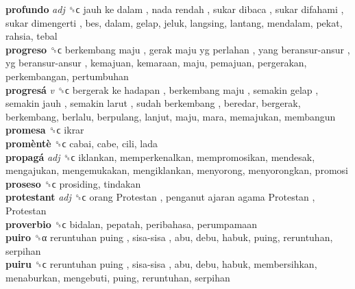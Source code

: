\textbf{profundo} \emph{adj}  ␝ϲ   jauh ke dalam ,  nada rendah ,  sukar dibaca ,  sukar difahami ,  sukar dimengerti , bes, dalam, gelap, jeluk, langsing, lantang, mendalam, pekat, rahsia, tebal  \\
\textbf{progreso} ␝ϲ   berkembang maju ,  gerak maju yg perlahan ,  yang beransur-ansur ,  yg beransur-ansur , kemajuan, kemaraan, maju, pemajuan, pergerakan, perkembangan, pertumbuhan  \\
\textbf{progresá} \emph{v}  ␝ϲ   bergerak ke hadapan ,  berkembang maju ,  semakin gelap ,  semakin jauh ,  semakin larut ,  sudah berkembang , beredar, bergerak, berkembang, berlalu, berpulang, lanjut, maju, mara, memajukan, membangun  \\
\textbf{promesa} ␝ϲ  ikrar  \\
\textbf{promèntè} ␝ϲ  cabai, cabe, cili, lada  \\
\textbf{propagá} \emph{adj}  ␝ϲ  iklankan, memperkenalkan, mempromosikan, mendesak, mengajukan, mengemukakan, mengiklankan, menyorong, menyorongkan, promosi  \\
\textbf{proseso} ␝ϲ  prosiding, tindakan  \\
\textbf{protestant} \emph{adj}  ␝ϲ   orang Protestan ,  penganut ajaran agama Protestan ,  Protestan   \\
\textbf{proverbio} ␝ϲ  bidalan, pepatah, peribahasa, perumpamaan  \\
\textbf{puiro} ␝α   reruntuhan puing ,  sisa-sisa , abu, debu, habuk, puing, reruntuhan, serpihan  \\
\textbf{puiru} ␝ϲ   reruntuhan puing ,  sisa-sisa , abu, debu, habuk, membersihkan, menaburkan, mengebuti, puing, reruntuhan, serpihan  \\
